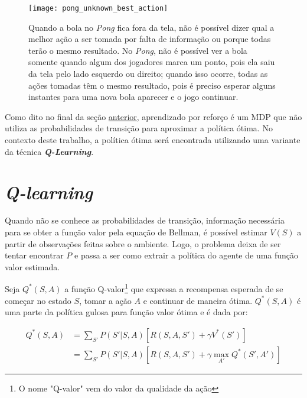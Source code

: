 \begin{figure}[h!]
  \centering
  \texttt{[image: pong\_unknown\_best\_action]}
  \caption{Quando a bola no \textit{Pong} fica fora da tela, não é possível dizer qual a melhor ação a ser tomada por falta de informação ou porque todas terão o mesmo resultado. No \textit{Pong}, não é possível ver a bola somente quando algum dos jogadores marca um ponto, pois ela saiu da tela pelo lado esquerdo ou direito; quando isso ocorre, todas as ações tomadas têm o mesmo resultado, pois é preciso esperar alguns instantes para uma nova bola aparecer e o jogo continuar.}
  \label{fig:unknown_best_action}
\end{figure}

Como dito no final da seção \hyperref[sec:mdp]{anterior}, aprendizado por reforço é um MDP que não utiliza as probabilidades de transição para aproximar a política ótima.
No contexto deste trabalho, a política ótima será encontrada utilizando uma variante da técnica \textit{\textbf{Q-Learning}}.


\section{\textit{Q-learning}}
\label{sec:ql}

Quando não se conhece as probabilidades de transição, informação necessária para se obter a função valor pela equação de Bellman, é possível estimar $V(S)$ a partir de observações feitas sobre o ambiente.
Logo, o problema deixa de ser tentar encontrar $P$ e passa a ser como extrair a política do agente de uma função valor estimada.

Seja $Q^{*}(S,A)$ a função Q-valor\footnote{O nome "Q-valor"{} vem do valor da qualidade da ação} que expressa a recompensa esperada de se começar no estado $S$, tomar a ação $A$ e continuar de maneira ótima. $Q^{*}(S,A)$ é uma parte da política gulosa para função valor ótima e é dada por:

\begin{equation} \label{eq:qfunction}
\begin{align*}
Q^{*}(S,A) &= \sum_{S'}P(S'|S,A)[R(S,A,S') + \gamma V^{*}(S')] \\
        &= \sum_{S'}P(S'|S,A)[R(S,A,S') + \gamma \max_{A'}Q^{*}(S',A')]
\end{align*}
\end{equation}

